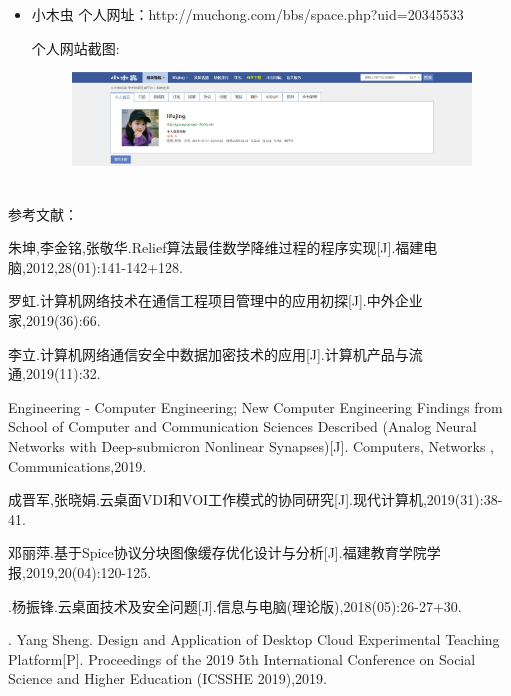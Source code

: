 \documentclass{article}
\begin{document}
\begin{itemize}
\begin{figure}[h!]
   	\caption{}
   	\label{fig:k}
   \end{figure}
   \newpage
    \item 小木虫 个人网址：http://muchong.com/bbs/space.php?uid=20345533\par
   个人网站截图:\par
   \begin{figure}[h!]
   	\centering
   	\includegraphics[scale=0.2]{mc}
   	\caption{}
   	\label{fig:mc}
   \end{figure}
   
\end{itemize}

















\hspace*{\fill} \\

\newpage
{\Large{\Large  参考文献：}}\par
[1] 朱坤,李金铭,张敬华.Relief算法最佳数学降维过程的程序实现[J].福建电脑,2012,28(01):141-142+128.\par
[2] 罗虹.计算机网络技术在通信工程项目管理中的应用初探[J].中外企业家,2019(36):66.\par
[3] 李立.计算机网络通信安全中数据加密技术的应用[J].计算机产品与流通,2019(11):32.\par
[4] Engineering - Computer Engineering; New Computer Engineering Findings from School of Computer and Communication Sciences Described (Analog Neural Networks with Deep-submicron Nonlinear Synapses)[J]. Computers, Networks , Communications,2019. \par
[5] 成晋军,张晓娟.云桌面VDI和VOI工作模式的协同研究[J].现代计算机,2019(31):38-41.\par
[6] 邓丽萍.基于Spice协议分块图像缓存优化设计与分析[J].福建教育学院学报,2019,20(04):120-125.\par
[7].杨振锋.云桌面技术及安全问题[J].信息与电脑(理论版),2018(05):26-27+30.\par
[8]. Yang Sheng. Design and Application of Desktop Cloud Experimental Teaching Platform[P]. Proceedings of the 2019 5th International Conference on Social Science and Higher Education (ICSSHE 2019),2019.\par
\end{document}
